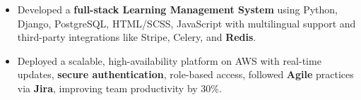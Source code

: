 \documentclass[10pt]{extarticle}
\begin{document}
\begin{itemize}
\begin{itemize}
        \vspace{1pt}\item Developed a \textbf{full-stack Learning Management System} using Python, Django, PostgreSQL, HTML/SCSS, JavaScript with multilingual support and third-party integrations like Stripe, Celery, and \textbf{Redis}.\vspace{1pt}
        \item Deployed a scalable, high-availability platform on AWS with real-time updates, \textbf{secure authentication}, role-based access, followed \textbf{Agile} practices via \textbf{Jira}, improving team productivity by 30\%.
    \end{itemize}


\end{itemize}
\end{document}
